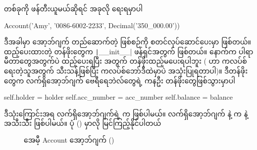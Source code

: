   တစ်ခုကို ဖန်တီးယူမယ်ဆိုရင်  အခုလို ရေးရမှာပါ
%
\begin{py}
Account('Amy', '0086-6002-2233', Decimal('350_000.00'))
\end{py}
%
ဒီအခါမှာ အော့ဘ်ဂျက် တည်ဆောက်တဲ့ ဖြစ်စဉ်ကို စတင်လုပ်ဆောင်ပေးမှာ ဖြစ်တယ်။ ထည့်ပေးထားတဲ့ တန်ဖိုးတွေက \texttt|__init__| ဖန်ရှင်အတွက် ဖြစ်တယ်။  နောက်က ပါရာမီတာတွေအတွက်ပဲ ထည့်ပေးရပြီး  အတွက် တန်ဖိုးထည့်မပေးရပါဘူး ( ဟာ ကလပ်စ်ရေးတဲ့သူအတွက် သီးသန့်ဖြစ်ပြီး ကလပ်စ်ဘော်ဒီထဲမှာပဲ အသုံးပြုရတာပါ)။ ဒီတန်ဖိုးတွေက  လက်ရှိအော့ဘ်ဂျက်  ဗေရီရေဘဲလ်တွေရဲ့ ကနဦး တန်ဖိုးတွေဖြစ်သွားမှာပါ
%
\begin{py}
self.holder = holder
self.acc_number = acc_number
self.balance = balance
\end{py}
%
ဒီသုံးကြောင်းအရ လက်ရှိအော့ဘ်ဂျက်ရဲ့  က  ဖြစ်ပါမယ်။ လက်ရှိအော့ဘ်ဂျက်  နဲ့  က  နဲ့  အသီးသီး ဖြစ်ပါမယ်။ ပုံ (\fRefNo{\ref{fig:AmyAccObj1}}) မှာလို မြင်ကြည့်နိုင်ပါတယ်

\begin{figure}[tbh!]
\def\fObjFigAttrValWidth{3}
\def\fObjFigAttrValHeight{1}
\newcommand{\figpctw}{0.48}
\caption{အေမီ့ Account အော့ဘ်ဂျက် ()}
\label{fig:AmyAccObj1}
\end{figure}

